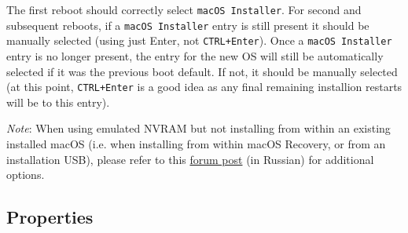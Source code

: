 \documentclass[]{article}
\makeatletter
\renewcommand{\label}[1]{%
\zref@wrapper@immediate{\oldlabel{#1}}}  %
\makeatother
\begin{document}
The first reboot should correctly select \texttt{macOS Installer}. For second and subsequent reboots, if a \texttt{macOS Installer}
entry is still present it should be manually selected (using just Enter, not \texttt{CTRL+Enter}). Once a \texttt{macOS Installer}
entry is no longer present, the entry for the new OS will still be automatically selected if it was the previous boot default.
If not, it should be manually selected (at this point, \texttt{CTRL+Enter} is a good idea as any final remaining installion restarts
will be to this entry).

\emph{Note}: When using emulated NVRAM but not installing from within an existing installed macOS (i.e. when installing from
within macOS Recovery, or from an installation USB), please refer to this
\href{https://applelife.ru/posts/916248}{forum post} (in Russian)
for additional options.

\subsection{Properties}\label{uefiprops}
\end{document}
